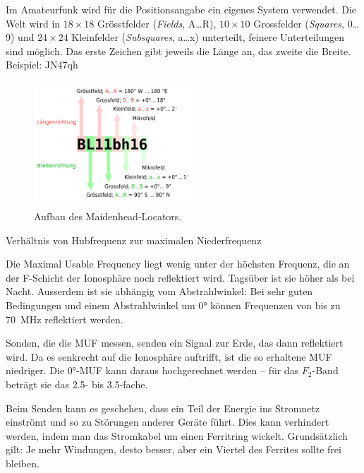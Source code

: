 {Im Amateurfunk wird für die Positionsangabe ein eigenes System verwendet. Die Welt wird in $18\times 18$ Grösstfelder (\textit{Fields}, A…R), $10\times 10$ Grossfelder (\textit{Squares}, 0…9) und $24\times 24$ Kleinfelder (\textit{Subsquares}, a…x) unterteilt, feinere Unterteilungen sind möglich. Das erste Zeichen gibt jeweils die Länge an, das zweite die Breite. Beispiel: JN47qh

\begin{figure}[h!]
 \centering
 \includegraphics[width=6cm]{./png/Maidenhead_QTH-Locator_erklaert.png}
 \caption{Aufbau des Maidenhead-Locators. }
 \label{fig:maidenhead}
\end{figure}

}

{Verhältnis von Hubfrequenz zur maximalen Niederfrequenz}

{Die Maximal Usable Frequency liegt wenig unter der höchsten Frequenz, die an der F-Schicht der Ionosphäre noch reflektiert wird. Tagsüber ist sie höher als bei Nacht. Ausserdem ist sie abhängig vom Abstrahlwinkel: Bei sehr guten Bedingungen und einem Abstrahlwinkel um 0° können Frequenzen von bis zu 70 MHz reflektiert werden.

Sonden, die die MUF messen, senden ein Signal zur Erde, das dann reflektiert wird. Da es senkrecht auf die Ionosphäre auftrifft, ist die so erhaltene MUF niedriger. Die 0°-MUF kann daraus hochgerechnet werden – für das $F_2$-Band beträgt sie das 2.5- bis 3.5-fache.}

{Beim Senden kann es geschehen, dass ein Teil der Energie ins Stromnetz einströmt und so zu Störungen anderer Geräte führt. Dies kann verhindert werden, indem man das Stromkabel um einen Ferritring wickelt. Grundsätzlich gilt: Je mehr Windungen, desto besser, aber ein Viertel des Ferrites sollte frei bleiben.}

